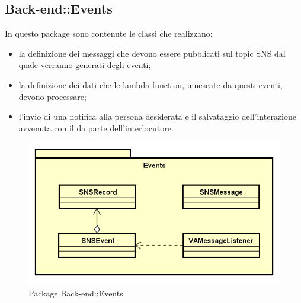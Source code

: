 \subsection{Back-end::Events}
In questo package sono contenute le classi che realizzano: \begin{itemize} \item la definizione dei messaggi che devono essere pubblicati sul topic SNS dal quale verranno generati degli eventi; \item la definizione dei dati che le lambda function, innescate da questi eventi, devono processare; \item l'invio di una notifica alla persona desiderata e il salvataggio dell'interazione avvenuta con il  da parte dell'interlocutore. \end{itemize}
\begin{figure}[h] \centering \includegraphics[width=\textwidth,height=\textheight,keepaspectratio]{images/diagrams/back-end/Official_Backend_0304/Events.png}
	\caption{Package Back-end::Events}
\end{figure}
\newpage

